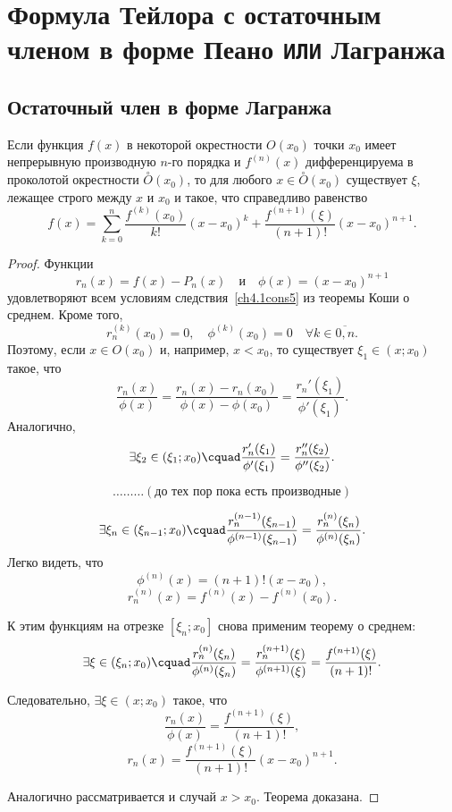 \section{Формула Тейлора с остаточным членом в форме Пеано \texttt{ИЛИ} Лагранжа}

\subsection{Остаточный член в форме Лагранжа}
	
\begin{thm} \label{ch5.thm1}
Если функция $f(x)$ в некоторой окрестности $O(x_0)$ точки $x_0$ имеет непрерывную производную $n$-го порядка и $f^{(n)}(x)$ дифференцируема в проколотой окрестности $\overset{\circ}{O}(x_0)$, то для любого
$x \in \overset{\circ}{O}(x_0)$ существует $\xi$, лежащее строго между $x$ и $x_0$ и такое, что справедливо равенство
\begin{equation} \label{ch5.1eq1}
f(x) = \sum_{k = 0}^{n} \frac{f^{(k)}(x_0)}{k!}(x - x_0)^k + \frac{f^{(n + 1)}(\xi)}{(n + 1)!}(x - x_0)^{n + 1}.
\end{equation}
\end{thm}

\begin{proof}
Функции $$r_n(x) = f(x) - P_n(x) \quad \text{и} \quad \phi(x) = (x - x_0)^{n + 1}$$ удовлетворяют всем условиям следствия~\ref{ch4.1cons5} из теоремы Коши о среднем. Кроме того, 
$$
r_n^{(k)}(x_0) = 0, \quad \phi^{(k)}(x_0) = 0 \quad \forall k \in \overline{0,n}.
$$ 
Поэтому, если $x \in O(x_0)$ и, например, $x < x_0$, то существует $\xi_1 \in (x; x_0)$ такое, что
$$
\frac{r_n(x)}{\phi(x)} = \frac{r_n(x) - r_n(x_0)}{\phi(x) - \phi(x_0)} = \frac{r_n'(\xi_1)}{\phi'(\xi_1)}.
$$
Аналогично,
$$
\exists \xi_2 \in (\xi_1; x_0)\cquad \frac{r_n'(\xi_1)}{\phi'(\xi_1)} = \frac{r_n''(\xi_2)}{\phi''(\xi_2)}.
$$

$$\ldots\ldots\ldots (\text{до тех пор пока есть производные})$$

$$
\exists \xi_n \in (\xi_{n - 1}; x_0) \cquad \frac{r_n^{(n - 1)}(\xi_{n - 1})}{\phi^{(n - 1)}(\xi_{n - 1})} = \frac{r_n^{(n)}(\xi_{n})}{\phi^{(n)}(\xi_{n})}.
$$
Легко видеть, что 
$$
\phi^{(n)}(x) = (n + 1)!(x - x_0),
$$
$$
r_n^{(n)}(x) = f^{(n)}(x) - f^{(n)}(x_0).
$$

К этим функциям на отрезке $[\xi_n; x_0]$ снова применим теорему о среднем:
$$
\exists \xi \in (\xi_n; x_0)\cquad \frac{r_n^{(n)}(\xi_{n})}{\phi^{(n)}(\xi_{n})} = \frac{r_n^{(n + 1)}(\xi)}{\phi^{(n + 1)}(\xi)} = \frac{f^{(n + 1)}(\xi)}{(n + 1)!}.
$$

Следовательно, $\exists \xi \in (x; x_0)$ такое, что
$$
\frac{r_n(x)}{\phi(x)} = \frac{f^{(n + 1)}(\xi)}{(n + 1)!},
$$
$$
r_n(x) = \frac{f^{(n + 1)}(\xi)}{(n + 1)!}(x - x_0)^{n + 1}.
$$

Аналогично рассматривается и случай $x > x_0$. Теорема доказана.
\end{proof}

